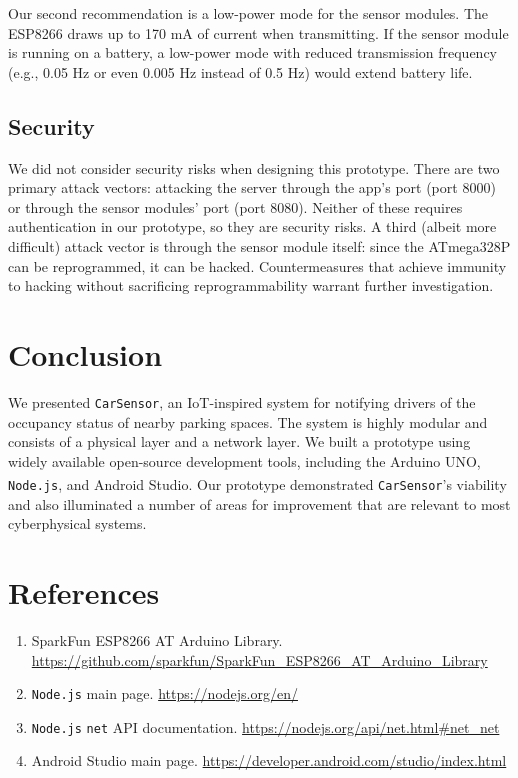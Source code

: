 \documentclass[conference]{IEEEtran}
\begin{document}
Our second recommendation is a low-power mode for the sensor modules. The ESP8266 draws up to 170 mA of current when transmitting. If the sensor module is running on a battery, a low-power mode with reduced transmission frequency (e.g., 0.05 Hz or even 0.005 Hz instead of 0.5 Hz) would extend battery life.
\subsection{Security}
We did not consider security risks when designing this prototype. There are two primary attack vectors: attacking the server through the app's port (port 8000) or through the sensor modules' port (port 8080). Neither of these requires authentication in our prototype, so they are security risks. A third (albeit more difficult) attack vector is through the sensor module itself: since the ATmega328P can be reprogrammed, it can be hacked. Countermeasures that achieve immunity to hacking without sacrificing reprogrammability warrant further investigation.
\section{Conclusion}\label{sec_conc}
We presented \texttt{CarSensor}, an IoT-inspired system for notifying drivers of the occupancy status of nearby parking spaces. The system is highly modular and consists of a physical layer and a network layer. We built a prototype using widely available open-source development tools, including the Arduino UNO, \texttt{Node.js}\textsuperscript{\textregistered}, and Android Studio. Our prototype demonstrated \texttt{CarSensor}'s viability and also illuminated a number of areas for improvement that are relevant to most cyberphysical systems.

\section*{References}
\begin{enumerate}
\item SparkFun ESP8266 AT Arduino Library. \url{https://github.com/sparkfun/SparkFun_ESP8266_AT_Arduino_Library}
\item \texttt{Node.js} main page. \url{https://nodejs.org/en/}
\item \texttt{Node.js} \texttt{net} API documentation. \url{https://nodejs.org/api/net.html\#net_net}
\item Android Studio main page. \url{https://developer.android.com/studio/index.html}

\end{enumerate}
\end{document}
